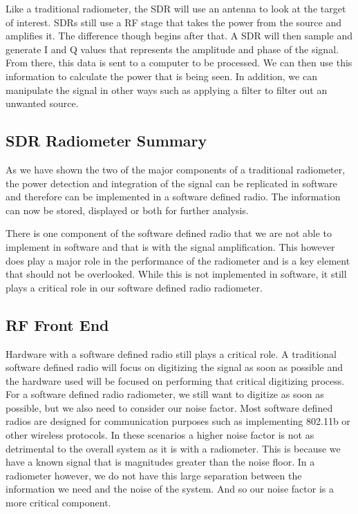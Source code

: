 Like a traditional radiometer, the SDR will use an antenna to look at the target of interest.  SDRs still use a RF stage that takes the power from the source and amplifies it.  The difference though begins after that.  A SDR will then sample and generate I and Q values that represents the amplitude and phase of the signal.  From there, this data is sent to a computer to be processed.  We can then use this information to calculate the power that is being seen.  In addition, we can manipulate the signal in other ways such as applying a filter to filter out an unwanted source.

\subsection{SDR Radiometer Summary}

As we have shown the two of the major components of a traditional radiometer, the power detection and integration of the signal can be replicated in software and therefore can be implemented in a software defined radio.  The information can now be stored, displayed or both for further analysis.  

There is one component of the software defined radio that we are not able to implement in software and that is with the signal amplification.  This however does play a major role in the performance of the radiometer and is a key element that should not be overlooked.  While this is not implemented in software, it still plays a critical role in our software defined radio radiometer. 

\subsection{RF Front End}

Hardware with a software defined radio still plays a critical role.  A traditional software defined radio will focus on digitizing the signal as soon as possible and the hardware used will be focused on performing that critical digitizing process.  For a software defined radio radiometer, we still want to digitize as soon as possible, but we also need to consider our noise factor.  Most software defined radios are designed for communication purposes such as implementing 802.11b or other wireless protocols.  In these scenarios a higher noise factor is not as detrimental to the overall system as it is with a radiometer.  This is because we have a known signal that is magnitudes greater than the noise floor.  In a radiometer however, we do not have this large separation between the information we need and the noise of the system.  And so our noise factor is a more critical component.  

